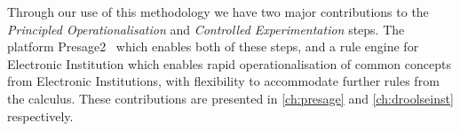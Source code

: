 Through our use of this methodology we have two major contributions to the \emph{Principled Operationalisation} and \emph{Controlled Experimentation} steps. The platform Presage2~\citep{Macbeth2014} which enables both of these steps, and a rule engine for Electronic Institution which enables rapid operationalisation of common concepts from Electronic Institutions, with flexibility to accommodate further rules from the calculus. These contributions are presented in \autoref{ch:presage} and \autoref{ch:droolseinst} respectively.
